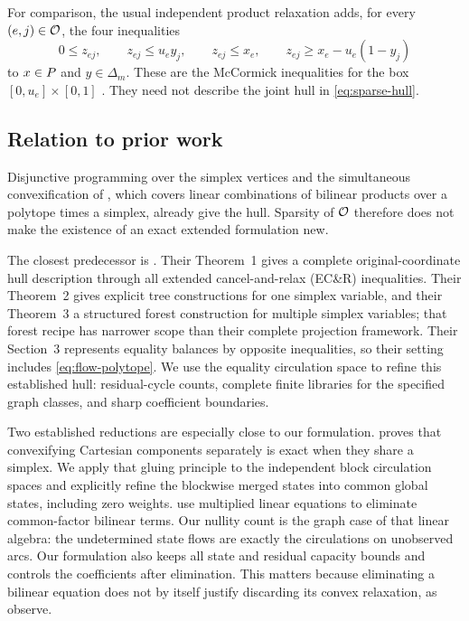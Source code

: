 For comparison, the usual independent product relaxation adds, for every
$(e,j)\in\mathcal O$, the four inequalities
\begin{equation}\label{eq:mccormick}
 0\le z_{ej},\qquad z_{ej}\le u_e y_j,\qquad
 z_{ej}\le x_e,\qquad
 z_{ej}\ge x_e-u_e(1-y_j)
\end{equation}
to $x\in P$ and $y\in\Delta_m$. These are the McCormick inequalities
for the box $[0,u_e]\times[0,1]$ \citep{McCormick1976}. They need not describe
the joint hull in \eqref{eq:sparse-hull}.

\subsection{Relation to prior work}\label{subsec:prior-work}
Disjunctive programming \citep{Balas1998} over the simplex vertices and
the simultaneous convexification of \citet{DavarniaRichardTawarmalani2017},
which covers linear combinations of bilinear products over a polytope times
a simplex, already give the hull. Sparsity of $\mathcal O$ therefore does not make
the existence of an exact extended formulation new.

The closest predecessor is \citet{KhademniaDavarnia2025}. Their Theorem~1
gives a complete original-coordinate hull description through all extended
cancel-and-relax (EC\&R) inequalities. Their Theorem~2 gives explicit tree
constructions for one simplex variable, and their Theorem~3 a structured
forest construction for multiple simplex variables; that forest recipe has
narrower scope than their complete projection framework. Their Section~3
represents equality balances by opposite inequalities, so their setting
includes \eqref{eq:flow-polytope}. We use the equality circulation space to
refine this established hull: residual-cycle counts, complete finite
libraries for the specified graph classes, and sharp coefficient boundaries.

Two established reductions are especially close to our formulation.
\citet[Proposition~2.6]{Davarnia2016} proves that convexifying Cartesian
components separately is exact when they share a simplex. We apply that
gluing principle to the independent block circulation spaces and explicitly
refine the blockwise merged states into common global states, including
zero weights. \citet[Theorem~3.1]{LibertiPantelides2006} use multiplied linear
equations to eliminate common-factor bilinear terms. Our nullity count is
the graph case of that linear algebra: the undetermined state flows are
exactly the circulations on unobserved arcs. Our formulation also keeps all
state and residual capacity bounds and controls the coefficients after
elimination. This matters because eliminating a bilinear equation does not
by itself justify discarding its convex relaxation, as
\citet[discussion after Theorem~3.1]{LibertiPantelides2006} observe.


